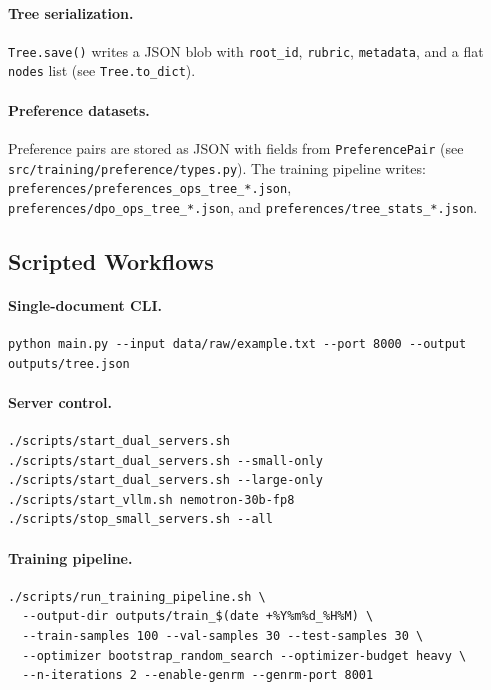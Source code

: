 \paragraph{Tree serialization.}
\texttt{Tree.save()} writes a JSON blob with \texttt{root\_id}, \texttt{rubric},
\texttt{metadata}, and a flat \texttt{nodes} list (see \texttt{Tree.to\_dict}).

\paragraph{Preference datasets.}
Preference pairs are stored as JSON with fields from \texttt{PreferencePair}
(see \texttt{src/training/preference/types.py}). The training pipeline writes:
\texttt{preferences/preferences\_ops\_tree\_*.json},
\texttt{preferences/dpo\_ops\_tree\_*.json}, and
\texttt{preferences/tree\_stats\_*.json}.

\subsection{Scripted Workflows}

\paragraph{Single-document CLI.}
\begin{lstlisting}
python main.py --input data/raw/example.txt --port 8000 --output outputs/tree.json
\end{lstlisting}

\paragraph{Server control.}
\begin{lstlisting}
./scripts/start_dual_servers.sh
./scripts/start_dual_servers.sh --small-only
./scripts/start_dual_servers.sh --large-only
./scripts/start_vllm.sh nemotron-30b-fp8
./scripts/stop_small_servers.sh --all
\end{lstlisting}

\paragraph{Training pipeline.}
\begin{lstlisting}
./scripts/run_training_pipeline.sh \
  --output-dir outputs/train_$(date +%Y%m%d_%H%M) \
  --train-samples 100 --val-samples 30 --test-samples 30 \
  --optimizer bootstrap_random_search --optimizer-budget heavy \
  --n-iterations 2 --enable-genrm --genrm-port 8001
\end{lstlisting}

